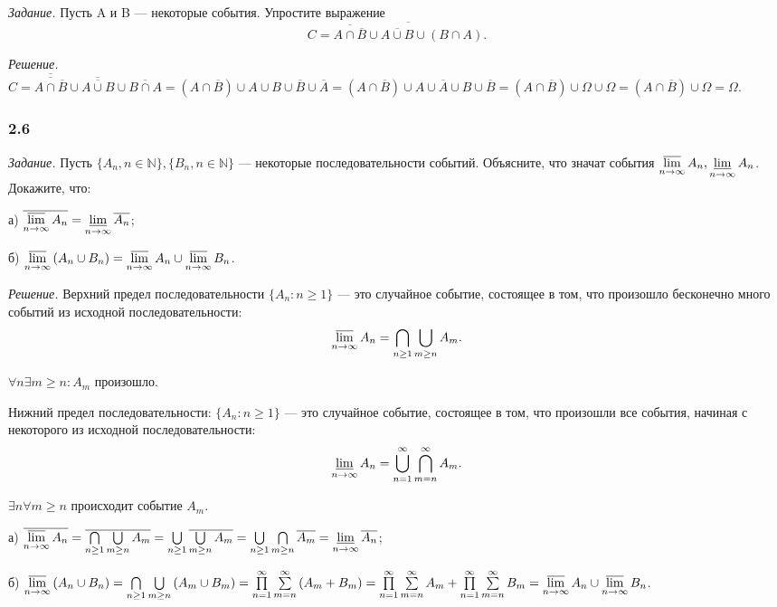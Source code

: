 \documentclass{book}
\begin{document}
\textit{Задание.} Пусть A и B --- некоторые события. Упростите выражение $$C=\overline{\overline{A\cap\overline{B}}\cup\overline{A\cup B}\cup\left(B\cap A\right)}.$$

\textit{Решение.} $C=\overline{\overline{A\cap\overline{B}}}\cup\overline{\overline{A\cup B}}\cup\overline{B\cap A}=\left(A\cap\overline{B}\right)\cup A\cup B\cup\overline{B}\cup\overline{A}=\left(A\cap\overline{B}\right)\cup A\cup\overline{A}\cup B\cup\overline{B}=\left(A\cap\overline{B}\right)\cup\Omega\cup\Omega=\left(A\cap\overline{B}\right)\cup\Omega=\Omega$.

\subsubsection*{2.6}

\textit{Задание.} Пусть $\{A_n, n\in\mathbb{N}\}, \{B_n, n\in\mathbb{N}\}$ --- некоторые последовательности событий. Объясните, что значат события $\varlimsup\limits_{n\to\infty}A_n, \varliminf\limits_{n\to\infty}A_n$. Докажите, что:

а) $\overline{\varlimsup\limits_{n\to\infty}A_n}=\varliminf\limits_{n\to\infty}\overline{A_n}$;

б) $\varlimsup\limits_{n\to\infty}\left(A_n\cup B_n\right)=\varlimsup\limits_{n\to\infty}A_n\cup\varlimsup\limits_{n\to\infty}B_n$.

\textit{Решение.} Верхний предел последовательности $\{A_n: n\geq 1\}$ --- это случайное событие, состоящее в том, что произошло бесконечно много событий из исходной последовательности: $$\varlimsup\limits_{n\to\infty}A_n=\bigcap\limits_{n\geq 1}\bigcup\limits_{m\geq n}A_m.$$

$\forall n \exists m\geq n: A_m$ произошло.

Нижний предел последовательности: $\{A_n: n\geq 1\}$ --- это случайное событие, состоящее в том, что произошли все события, начиная с некоторого из исходной последовательности: $$\varliminf\limits_{n\to\infty}A_n=\bigcup\limits_{n=1}^\infty\bigcap\limits_{m=n}^\infty A_m.$$

$\exists n \forall m\geq n$ происходит событие $A_m$.

а) $\overline{\varlimsup\limits_{n\to\infty}A_n}=\overline{\bigcap\limits_{n\geq 1}\bigcup\limits_{m\geq n}A_m}=\bigcup\limits_{n\geq 1}\overline{\bigcup\limits_{m\geq n}A_m}=\bigcup\limits_{n\geq 1}\bigcap\limits_{m\geq n}\overline{A_m}=\varliminf\limits_{n\to\infty}\overline{A_n}$;

б) $\varlimsup\limits_{n\to\infty}\left(A_n\cup B_n\right)=\bigcap\limits_{n\geq 1}\bigcup\limits_{m\geq n}\left(A_m\cup B_m\right)=\prod\limits_{n=1}^\infty\sum\limits_{m=n}^\infty\left(A_m+B_m\right)=\prod\limits_{n=1}^\infty\sum\limits_{m=n}^\infty A_m+\prod\limits_{n=1}^\infty\sum\limits_{m=n}^\infty B_m=\varlimsup\limits_{n\to\infty}A_n\cup\varlimsup\limits_{n\to\infty}B_n$.
\end{document}
